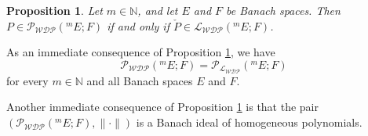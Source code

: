 \documentclass[12 pt]{article}%
\newtheorem{proposition}[theorem]{Proposition}
\newtheorem{final remark}[theorem]{Final Remark}
\begin{document}
\begin{proposition}\label{CHSCHCO}
	Let $m \in \mathbb{N}$, and let $E$ and $F$ be Banach spaces. Then $P \in \mathcal{P_{WDP}}(^mE;F)$ if and only if $\check{P} \in \mathcal{L_{WDP}}(^mE;F)$.
\end{proposition}



As an immediate consequence of Proposition \ref{CHSCHCO}, we have
\begin{equation*}
	\mathcal{P_{WDP}}(^mE;F) = \mathcal{P}_{\mathcal{L_{WDP}}}(^mE;F)
\end{equation*}
for every $m \in \mathbb{N}$ and all Banach spaces $E$ and $F$.

Another immediate consequence of Proposition \ref{CHSCHCO} is that the pair $(\mathcal{P_{WDP}}(^mE;F), \|\cdot\|)$ is a Banach ideal of homogeneous polynomials.
\end{document}
